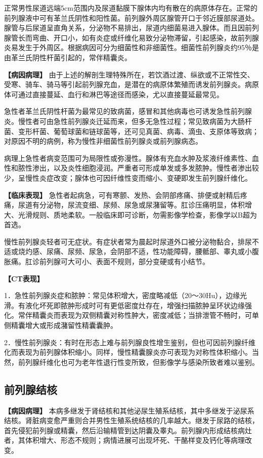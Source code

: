 正常男性尿道远端5cm范围内及尿道黏膜下腺体内均有散在的病原体存在。正常的前列腺液中可有革兰氏阴性和阳性菌。前列腺外周区腺管开口于邻近膜部尿道处。腺管与后尿道呈直角关系，分泌物不易排出，尿道内细菌易进入腺体。而且因前列腺管长而弯曲、开口小，如有炎症或纤维化易致分泌物滞留，引起感染，故前列腺炎易发生于外周区。根据病因可分为细菌性和非细菌性。细菌性前列腺炎约95％是由革兰氏阴性杆菌引起的，常伴精囊炎。

\textbf{【病因病理】}
由于上述的解剖生理特殊所在，若饮酒过渡、纵欲或不正常性交、受寒、骑车、骑马等引起前列腺充血，是潜在的病原体繁殖而诱发前列腺炎。病原体可通过直接蔓延、血行和淋巴等途径而感染，尤以直接蔓延最常见。

急性者革兰氏阴性杆菌为最常见的致病菌，感冒和其他病毒也可诱发急性前列腺炎。慢性者可由急性前列腺炎迁延而来，但多无急性过程；常见致病菌为大肠杆菌、变形杆菌、葡萄球菌和链球菌等，还可见真菌、病毒、滴虫、支原体等致病；对原因不明的病例，称为慢性非细菌性前列腺炎或前列腺病态。

病理上急性者病变范围可为局限性或弥漫性。腺体有充血水肿及浆液纤维素性、血性和脓性渗出，以及炎性细胞浸润。严重者可形成单发或多发脓肿。慢性者渗出较少，呈慢性炎症改变；腺体也可因纤维性变而缩小、变硬即发生前列腺纤维化。

\textbf{【临床表现】}
急性者起病急，可有寒颤、发热、会阴部疼痛、排便或射精后疼痛，尿道有分泌物，尿流变细、尿频、尿急或尿潴留等。肛诊压痛明显，体积增大、光滑规则、质地柔软。一般临床即可诊断，勿需影像学检查，影像学以B超为首选。

慢性前列腺炎轻者可无症状。有症状者常为晨起时尿道外口被分泌物黏合，排尿不适或烧灼感、尿痛、尿频、尿急，会阴部不适，性功能障碍，腰骶部、睾丸或小腹胀痛。肛诊前列腺可大可小、表面不规则，部分变硬或有小结节。

\textbf{【CT表现】}

1．急性前列腺炎症和脓肿：常见体积增大，密度略减低（20～30Hu），边缘光滑。有液化坏死即脓肿形成时可有更低密度灶存在，增强扫描脓肿呈环状边缘强化。常伴精囊炎而表现为双侧精囊对称性肿大，密度减低；当排泄管不畅时，可单侧精囊增大或形成潴留性精囊囊肿。

2．慢性前列腺炎：有时在形态上难与前列腺良性增生鉴别，但也可因前列腺纤维化而表现为前列腺体积缩小。同样，慢性精囊腺炎亦可表现为对称性体积缩小。当然，前列腺纤维化也可为老年性退行性变所致，但影像学与感染所致者难以鉴别。

\subsection{前列腺结核}

\textbf{【病因病理】}
本病多继发于肾结核和其他泌尿生殖系结核，其中多继发于泌尿系结核。肾脏病变愈严重则合并男性生殖系统结核的几率越大。继发于尿路的结核，首先侵犯前列腺或精囊，然后沿输精管到达阴囊及睾丸。前列腺内形成结核病灶者，其体积增大、形态不规则；病情进展可出现坏死、干酪样变及钙化等病理改变。

